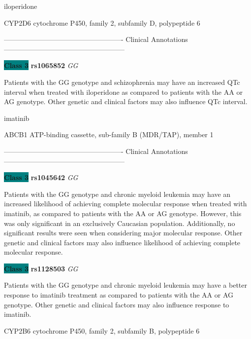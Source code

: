 \documentclass{resume} %
\begin{document}
\begin{rSection}{ iloperidone }
\begin{rSubsection}{ CYP2D6 }{ cytochrome P450, family 2, subfamily D, polypeptide 6 }{}{}
\item[]

\item[] ---------------------------------------------------- Clinical Annotations -----------------------------------------------------\newline
\item \textbf{\colorbox{teal} {Class 3}} \textbf{ rs1065852 } \textit{ GG }
\item[] Patients with the GG genotype and schizophrenia may have an increased QTc interval when treated with iloperidone as compared to patients with the AA or AG genotype. Other genetic and clinical factors may also influence QTc interval.
\end{rSubsection}

\end{rSection}\begin{rSection}{ imatinib }
\item[]

\begin{rSubsection}{ ABCB1 }{ ATP-binding cassette, sub-family B (MDR/TAP), member 1 }{}{}
\item[]

\item[] ---------------------------------------------------- Clinical Annotations -----------------------------------------------------\newline
\item \textbf{\colorbox{teal} {Class 3}} \textbf{ rs1045642 } \textit{ GG }
\item[] Patients with the GG genotype and chronic myeloid leukemia may have an increased likelihood of achieving complete molecular response when treated with imatinib, as compared to patients with the AA or AG genotype. However, this was only significant in an exclusively Caucasian population. Additionally, no significant results were seen when considering major molecular response. Other genetic and clinical factors may also influence likelihood of achieving complete molecular response.\item \textbf{\colorbox{teal} {Class 3}} \textbf{ rs1128503 } \textit{ GG }
\item[] Patients with the GG genotype and chronic myeloid leukemia may have a better response to imatinib treatment as compared to patients with the AA or AG genotype. Other genetic and clinical factors may also influence response to imatinib. 
\end{rSubsection}\begin{rSubsection}{ CYP2B6 }{ cytochrome P450, family 2, subfamily B, polypeptide 6 }{}{}
\item[]


\end{rSubsection}
\end{rSection}
\end{document}
